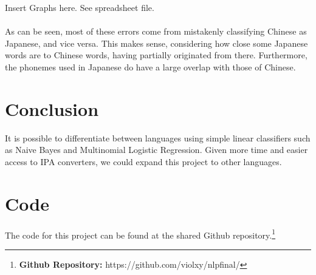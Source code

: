 \documentclass[a4paper]{article}
\begin{document}
Insert Graphs here. See spreadsheet file.\\
\\As can be seen, most of these errors come from mistakenly classifying Chinese as Japanese, and vice versa. This makes sense, considering how close some Japanese words are to Chinese words, having partially originated from there. Furthermore, the phonemes used in Japanese do have a large overlap with those of Chinese.
\section{Conclusion}
It is possible to differentiate between languages using simple linear classifiers such as Naive Bayes and Multinomial Logistic Regression. Given more time and easier access to IPA converters, we could expand this project to other languages.\\

\section{Code}
The code for this project can be found at the shared Github repository.\footnote{\textbf{Github Repository: }https://github.com/violxy/nlpfinal/}
\end{document}
